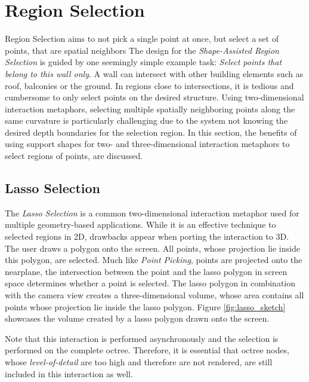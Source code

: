 \section{Region Selection}
\label{sec:regionSelection}
Region Selection aims to not pick a single point at once, but select a set of points, that are spatial neighbors
The design for the \textit{Shape-Assisted Region Selection} is guided by one seemingly simple example task: \textit{Select points that belong to this wall only}. A wall can intersect with other building elements such as roof, balconies or the ground. In regions close to intersections, it is tedious and cumbersome to only select points on the desired structure. Using two-dimensional interaction metaphors, selecting multiple spatially neighboring points along the same curvature is particularly challenging due to the system not knowing the desired depth boundaries for the selection region. In this section, the benefits of using support shapes for two- and three-dimensional interaction metaphors to select regions of points,  are discussed. 


\subsection{Lasso Selection}

The \textit{Lasso Selection} is a common two-dimensional interaction metaphor used for multiple geometry-based applications. While it is an effective technique to selected regions in 2D, drawbacks appear when porting the interaction to 3D. The user draws a polygon onto the screen. All points, whose projection lie inside this polygon, are selected. Much like \textit{Point Picking}, points are projected onto the nearplane, the intersection between the point and the lasso polygon in screen space determines whether a point is selected. The lasso polygon in combination with the camera view creates a three-dimensional volume, whose area contains all points whose projection lie inside the lasso polygon. Figure \ref{fig:lasso_sketch} showcases the volume created by a lasso polygon drawn onto the screen.

Note that this interaction is performed asynchronously and the selection is performed on the complete octree. Therefore, it is essential that octree nodes, whose \textit{level-of-detail} are too high and therefore are not rendered, are still included in this interaction as well. 


